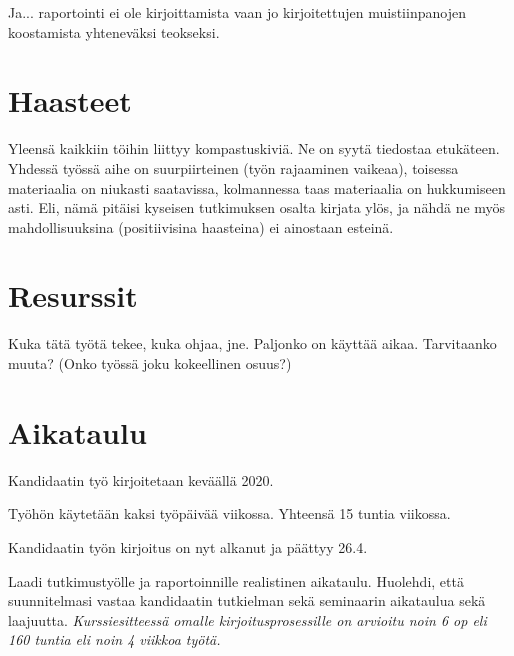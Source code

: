 \documentclass[12pt,a4paper,finnish,oneside]{article}
\begin{document}
Ja... raportointi ei ole kirjoittamista vaan jo kirjoitettujen
muistiinpanojen koostamista yhteneväksi teokseksi.

\section{Haasteet}

Yleensä kaikkiin töihin liittyy kompastuskiviä. Ne on syytä tiedostaa
etukäteen. Yhdessä työssä aihe on suurpiirteinen (työn rajaaminen
vaikeaa), toisessa materiaalia on niukasti saatavissa, kolmannessa
taas materiaalia on hukkumiseen asti.  Eli, nämä pitäisi kyseisen
tutkimuksen osalta kirjata ylös, ja nähdä ne myös mahdollisuuksina
(positiivisina haasteina) ei ainostaan esteinä.

\section{Resurssit}

Kuka tätä työtä tekee, kuka ohjaa, jne. Paljonko on käyttää
aikaa. Tarvitaanko muuta? (Onko työssä joku kokeellinen osuus?)

\section{Aikataulu}

Kandidaatin työ kirjoitetaan keväällä 2020.

Työhön käytetään kaksi työpäivää viikossa. Yhteensä 15 tuntia viikossa.

Kandidaatin työn kirjoitus on nyt alkanut ja päättyy 26.4.


Laadi tutkimustyölle ja raportoinnille realistinen aikataulu.
Huolehdi, että suunnitelmasi vastaa kandidaatin tutkielman sekä
seminaarin aikataulua sekä laajuutta.  \emph{Kurssiesitteessä omalle
  kirjoitusprosessille on arvioitu noin 6 op eli 160 tuntia eli noin 4
  viikkoa työtä.}
\end{document}
